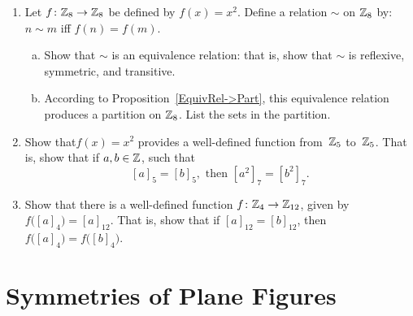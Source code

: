 \begin{enumerate}
\item
Let $f\colon \mathbb{Z}_8 \to \mathbb{Z}_8$ be defined by $f(x) =  x^2 $. Define a relation $\sim$ on $\mathbb{Z}_8$ by: $n \sim m$ iff $f(n) = f(m)$.
\begin{enumerate}[(a)]
\item
Show that $\sim$ is an equivalence relation: that is, show that $\sim$ is reflexive, symmetric, and transitive.
\item
According to Proposition~\ref{EquivRel->Part}, this equivalence relation produces a partition on  $\mathbb{Z}_8$. List the sets in the partition.
\end{enumerate}

\item
 Show that$f(x)=x^2$ provides a well-defined function from~$\mathbb{Z}_5$ to~$\mathbb{Z}_5$. That is, show that if $a,b \in \mathbb{Z}$, such that 
\[ [a]_5 = [b]_5, \text{ then } [ a^2]_7 = [ b^2]_7.\]


\item
Show that there is a well-defined function 
$f \colon \mathbb{Z}_4 \to \mathbb{Z}_{12}$, given by \\
$ f \bigl( [a]_4 \bigr) = [a]_{12}$. 
That is, show that if $[a]_{12} = [b]_{12}$, then $f \bigl( [a]_4 \bigr) = f \bigl( [b]_4 \bigr)$.



\end{enumerate}

\section{Symmetries of Plane Figures}

